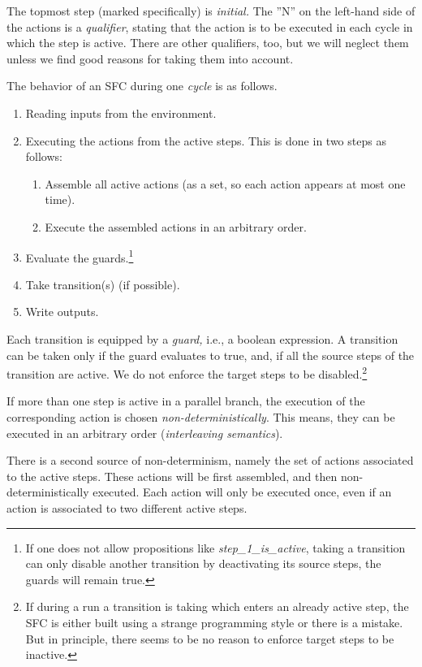 The topmost step (marked specifically) is \emph{initial.}  The ''N'' on the
left-hand side of the actions is a \emph{qualifier}, stating that the action
is to be executed in each cycle in which the step is active. There are other
qualifiers, too, but we will neglect them unless we find good reasons for
taking them into account.

The behavior of an SFC during one \emph{cycle} is as follows.
\begin{enumerate}
\item Reading inputs from the environment.
\item Executing the actions from the active steps.  This is done in two steps
  as follows:
  \begin{enumerate}
  \item Assemble all active actions (as a set, so each action appears at most
    one time).
  \item Execute the assembled actions in an arbitrary order.
  \end{enumerate}
\item Evaluate the guards.\footnote{If one does not allow propositions like
    \emph{step\_1\_is\_active}, taking a transition can only disable another
    transition by deactivating its source steps, the guards will remain true.}
\item Take transition(s) (if possible).
\item Write outputs.
\end{enumerate}

Each transition is equipped by a \emph{guard,} i.e., a boolean expression.
A transition can be taken only if the guard evaluates to true, and, if all
the source steps of the transition are active.  We do not enforce the
target steps to be disabled.\footnote{If during a run a transition is
  taking which enters an already active step, the SFC is either built using
  a strange programming style or there is a mistake.  But in principle,
  there seems to be no reason to enforce target steps to be inactive.}

If more than one step is active in a parallel branch, the execution of the
corresponding action is chosen \emph{non-deterministically}. This means,
they can be executed in an arbitrary order (\emph{interleaving semantics}).

There is a second source of non-determinism, namely the set of actions
associated to the active steps.  These actions will be first assembled, and
then non-deterministically executed.  Each action will only be executed once,
even if an action is associated to two different active steps.

